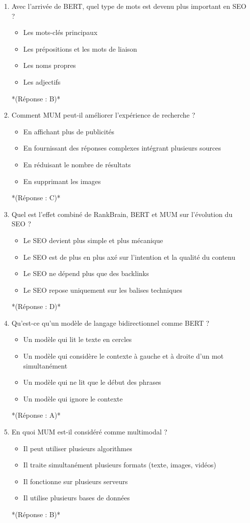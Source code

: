 \documentclass[12pt,a4paper,twoside]{report}
\begin{document}
\begin{enumerate}
\item Avec l'arrivée de BERT, quel type de mots est devenu plus important en SEO ?
\begin{itemize}
\item[A)] Les mots-clés principaux
\item[B)] Les prépositions et les mots de liaison
\item[C)] Les noms propres
\item[D)] Les adjectifs
\end{itemize}
*(Réponse : B)*

\item Comment MUM peut-il améliorer l'expérience de recherche ?
\begin{itemize}
\item[A)] En affichant plus de publicités
\item[B)] En fournissant des réponses complexes intégrant plusieurs sources
\item[C)] En réduisant le nombre de résultats
\item[D)] En supprimant les images
\end{itemize}
*(Réponse : C)*

\item Quel est l'effet combiné de RankBrain, BERT et MUM sur l'évolution du SEO ?
\begin{itemize}
\item[A)] Le SEO devient plus simple et plus mécanique
\item[B)] Le SEO est de plus en plus axé sur l'intention et la qualité du contenu
\item[C)] Le SEO ne dépend plus que des backlinks
\item[D)] Le SEO repose uniquement sur les balises techniques
\end{itemize}
*(Réponse : D)*

\item Qu'est-ce qu'un modèle de langage bidirectionnel comme BERT ?
\begin{itemize}
\item[A)] Un modèle qui lit le texte en cercles
\item[B)] Un modèle qui considère le contexte à gauche et à droite d'un mot simultanément
\item[C)] Un modèle qui ne lit que le début des phrases
\item[D)] Un modèle qui ignore le contexte
\end{itemize}
*(Réponse : A)*

\item En quoi MUM est-il considéré comme multimodal ?
\begin{itemize}
\item[A)] Il peut utiliser plusieurs algorithmes
\item[B)] Il traite simultanément plusieurs formats (texte, images, vidéos)
\item[C)] Il fonctionne sur plusieurs serveurs
\item[D)] Il utilise plusieurs bases de données
\end{itemize}
*(Réponse : B)*


\end{enumerate}
\end{document}
